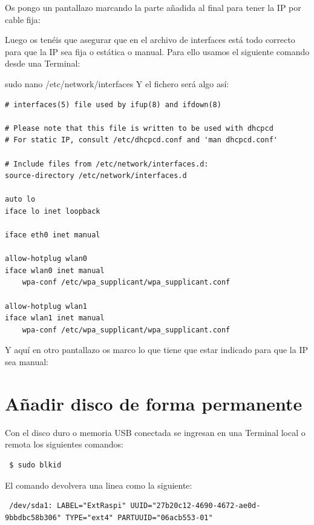 \documentclass{article}
\begin{document}
Os pongo un pantallazo marcando la parte añadida al final para tener la IP por cable fija:

Luego os tenéis que asegurar que en el archivo de interfaces está todo correcto para que la IP sea fija o estática o manual. Para ello usamos el siguiente comando desde una Terminal:

sudo nano /etc/network/interfaces
Y el fichero será algo así:

\begin{verbatim}
# interfaces(5) file used by ifup(8) and ifdown(8)

# Please note that this file is written to be used with dhcpcd
# For static IP, consult /etc/dhcpcd.conf and 'man dhcpcd.conf'

# Include files from /etc/network/interfaces.d:
source-directory /etc/network/interfaces.d

auto lo
iface lo inet loopback

iface eth0 inet manual

allow-hotplug wlan0
iface wlan0 inet manual
    wpa-conf /etc/wpa_supplicant/wpa_supplicant.conf

allow-hotplug wlan1
iface wlan1 inet manual
    wpa-conf /etc/wpa_supplicant/wpa_supplicant.conf
\end{verbatim}

Y aquí en otro pantallazo os marco lo que tiene que estar indicado para que la IP sea manual:

\section{Añadir disco de forma permanente}

Con el disco duro o memoria USB conectada se ingresan en una Terminal local o remota los siguientes comandos:

\begin{verbatim}
 $ sudo blkid

\end{verbatim}

El comando devolvera una linea como la siguiente:

\begin{verbatim}
 /dev/sda1: LABEL="ExtRaspi" UUID="27b20c12-4690-4672-ae0d-9bbdbc58b306" TYPE="ext4" PARTUUID="06acb553-01"

\end{verbatim}
\end{document}
